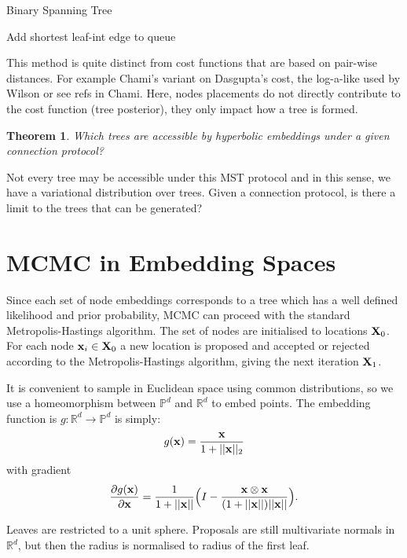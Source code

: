 \documentclass[11pt]{article}
\newtheorem{theorem}{Theorem}
\newcommand{\be}{\begin{equation*}}
\newcommand{\ee}{\end{equation*}}
\begin{document}
\begin{algorithm}
\caption{Binary Spanning Tree}
Add shortest leaf-int edge to queue\;
\end{algorithm}

This method is quite distinct from cost functions that are based on pair-wise distances. For example Chami's variant on Dasgupta's cost, the log-a-like used by Wilson or see refs in Chami. Here, nodes placements do not directly contribute to the cost function (tree posterior), they only impact how a tree is formed.

\begin{theorem} \label{thm:accessible}
Which trees are accessible by hyperbolic embeddings under a given connection protocol?
\end{theorem}
Not every tree may be accessible under this MST protocol and in this sense, we have a variational distribution over trees.
Given a connection protocol, is there a limit to the trees that can be generated?

\section{MCMC in Embedding Spaces}
Since each set of node embeddings corresponds to a tree which has a well defined likelihood and prior probability, MCMC can proceed with the standard Metropolis-Hastings algorithm.
The set of nodes are initialised to locations $\bold{X}_{0}$.
For each node $\bold{x}_{i} \in \bold{X}_{0}$ a new location is proposed and accepted or rejected according to the Metropolis-Hastings algorithm, giving the next iteration $\bold{X}_{1}$.

It is convenient to sample in Euclidean space using common distributions, so we use a homeomorphism between $\mathbb{P}^{d}$ and $\mathbb{R}^{d}$ to embed points.
The embedding function is $g: \mathbb{R}^{d} \to \mathbb{P}^{d}$ is simply:
\be
g(\bold{x}) = \dfrac{\bold{x}}{1+||\bold{x}||_{2}}
\ee
with gradient
\be
\frac{\partial g(\bold{x})}{\partial \bold{x}} = 
\dfrac{1}{1+||\bold{x}||} \Big( I - \dfrac{\bold{x} \otimes \bold{x}}{(1+||\bold{x}||)||\bold{x}||} \Big).
\ee

Leaves are restricted to a unit sphere.
Proposals are still multivariate normals in $\mathbb{R}^{d}$, but then the radius is  normalised to radius of the first leaf.
\end{document}
